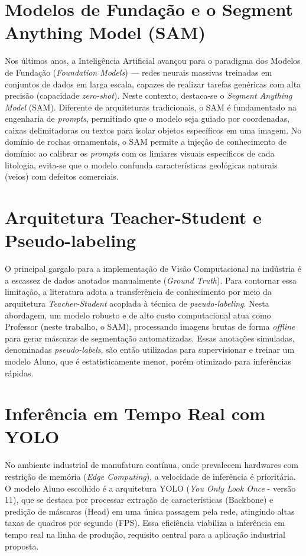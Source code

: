 \section{Modelos de Fundação e o Segment Anything Model (SAM)}
Nos últimos anos, a Inteligência Artificial avançou para o paradigma dos Modelos de Fundação (\textit{Foundation Models}) — redes neurais massivas treinadas em conjuntos de dados em larga escala, capazes de realizar tarefas genéricas com alta precisão (capacidade \textit{zero-shot}). Neste contexto, destaca-se o \textit{Segment Anything Model} (SAM). Diferente de arquiteturas tradicionais, o SAM é fundamentado na engenharia de \textit{prompts}, permitindo que o modelo seja guiado por coordenadas, caixas delimitadoras ou textos para isolar objetos específicos em uma imagem. No domínio de rochas ornamentais, o SAM permite a injeção de conhecimento de domínio: ao calibrar os \textit{prompts} com os limiares visuais específicos de cada litologia, evita-se que o modelo confunda características geológicas naturais (veios) com defeitos comerciais.

\section{Arquitetura Teacher-Student e Pseudo-labeling}
O principal gargalo para a implementação de Visão Computacional na indústria é a escassez de dados anotados manualmente (\textit{Ground Truth}). Para contornar essa limitação, a literatura adota a transferência de conhecimento por meio da arquitetura \textit{Teacher-Student} acoplada à técnica de \textit{pseudo-labeling}. Nesta abordagem, um modelo robusto e de alto custo computacional atua como Professor (neste trabalho, o SAM), processando imagens brutas de forma \textit{offline} para gerar máscaras de segmentação automatizadas. Essas anotações simuladas, denominadas \textit{pseudo-labels}, são então utilizadas para supervisionar e treinar um modelo Aluno, que é estatisticamente menor, porém otimizado para inferências rápidas.

\section{Inferência em Tempo Real com YOLO}
No ambiente industrial de manufatura contínua, onde prevalecem hardwares com restrição de memória (\textit{Edge Computing}), a velocidade de inferência é prioritária. O modelo Aluno escolhido é a arquitetura YOLO (\textit{You Only Look Once} - versão 11), que se destaca por processar extração de características (Backbone) e predição de máscaras (Head) em uma única passagem pela rede, atingindo altas taxas de quadros por segundo (FPS). 
Essa eficiência viabiliza a inferência em tempo real na linha de produção, requisito central para a aplicação industrial proposta.

